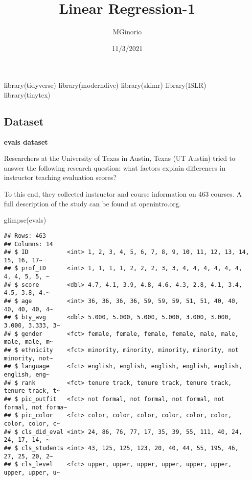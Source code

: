 \documentclass[
]{article}
\title{Linear Regression-1}
\author{MGinorio}
\date{11/3/2021}
\newenvironment{Shaded}{\begin{snugshade}}{\end{snugshade}}
\newcommand{\FunctionTok}[1]{\textcolor[rgb]{0.00,0.00,0.00}{#1}}
\newcommand{\NormalTok}[1]{#1}
\begin{document}
\maketitle

\begin{Shaded}
\begin{Highlighting}[]
\FunctionTok{library}\NormalTok{(tidyverse)}
\FunctionTok{library}\NormalTok{(moderndive)}
\FunctionTok{library}\NormalTok{(skimr)}
\FunctionTok{library}\NormalTok{(ISLR)}
\FunctionTok{library}\NormalTok{(tinytex)}
\end{Highlighting}
\end{Shaded}

\hypertarget{dataset}{%
\subsection{Dataset}\label{dataset}}

\textbf{evals dataset}

Researchers at the University of Texas in Austin, Texas (UT Austin)
tried to answer the following research question: what factors explain
differences in instructor teaching evaluation scores?

To this end, they collected instructor and course information on 463
courses. A full description of the study can be found at openintro.org.

\begin{Shaded}
\begin{Highlighting}[]
\FunctionTok{glimpse}\NormalTok{(evals)}
\end{Highlighting}
\end{Shaded}

\begin{verbatim}
## Rows: 463
## Columns: 14
## $ ID           <int> 1, 2, 3, 4, 5, 6, 7, 8, 9, 10, 11, 12, 13, 14, 15, 16, 17~
## $ prof_ID      <int> 1, 1, 1, 1, 2, 2, 2, 3, 3, 4, 4, 4, 4, 4, 4, 4, 4, 5, 5, ~
## $ score        <dbl> 4.7, 4.1, 3.9, 4.8, 4.6, 4.3, 2.8, 4.1, 3.4, 4.5, 3.8, 4.~
## $ age          <int> 36, 36, 36, 36, 59, 59, 59, 51, 51, 40, 40, 40, 40, 40, 4~
## $ bty_avg      <dbl> 5.000, 5.000, 5.000, 5.000, 3.000, 3.000, 3.000, 3.333, 3~
## $ gender       <fct> female, female, female, female, male, male, male, male, m~
## $ ethnicity    <fct> minority, minority, minority, minority, not minority, not~
## $ language     <fct> english, english, english, english, english, english, eng~
## $ rank         <fct> tenure track, tenure track, tenure track, tenure track, t~
## $ pic_outfit   <fct> not formal, not formal, not formal, not formal, not forma~
## $ pic_color    <fct> color, color, color, color, color, color, color, color, c~
## $ cls_did_eval <int> 24, 86, 76, 77, 17, 35, 39, 55, 111, 40, 24, 24, 17, 14, ~
## $ cls_students <int> 43, 125, 125, 123, 20, 40, 44, 55, 195, 46, 27, 25, 20, 2~
## $ cls_level    <fct> upper, upper, upper, upper, upper, upper, upper, upper, u~
\end{verbatim}
\end{document}
